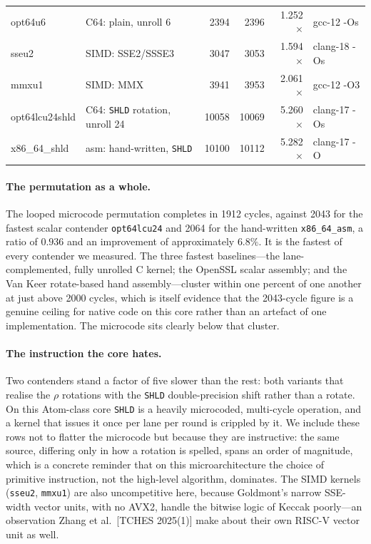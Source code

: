 \begin{table}[t]
\begin{tabular}{@{}llrrrl@{}}
opt64u6           & C64: plain, unroll 6                     & 2394 & 2396 & 1.252$\times$ & gcc-12 -Os \\
sseu2             & SIMD: SSE2/SSSE3                         & 3047 & 3053 & 1.594$\times$ & clang-18 -Os \\
mmxu1             & SIMD: MMX                                & 3941 & 3953 & 2.061$\times$ & gcc-12 -O3 \\
opt64lcu24shld    & C64: \texttt{SHLD} rotation, unroll 24   & 10058 & 10069 & 5.260$\times$ & clang-17 -Os \\
x86\_64\_shld     & asm: hand-written, \texttt{SHLD}         & 10100 & 10112 & 5.282$\times$ & clang-17 -O \\
\bottomrule
\end{tabular}
\end{table}

\paragraph{The permutation as a whole.}
The looped microcode permutation completes in 1912 cycles, against 2043 for the
fastest scalar contender \texttt{opt64lcu24} and 2064 for the hand-written
\texttt{x86\_64\_asm}, a ratio of $0.936$ and an improvement of approximately
$6.8\%$. It is the fastest of every contender we measured. The three fastest
baselines---the lane-complemented, fully unrolled C kernel; the OpenSSL scalar
assembly; and the Van Keer rotate-based hand assembly---cluster within one percent
of one another at just above 2000 cycles, which is itself evidence that the
2043-cycle figure is a genuine ceiling for native code on this core rather than an
artefact of one implementation. The microcode sits clearly below that cluster.

\paragraph{The instruction the core hates.}
Two contenders stand a factor of five slower than the rest: both variants that
realise the $\rho$ rotations with the \texttt{SHLD} double-precision shift rather
than a rotate. On this Atom-class core \texttt{SHLD} is a heavily microcoded,
multi-cycle operation, and a kernel that issues it once per lane per round is
crippled by it. We include these rows not to flatter the microcode but because
they are instructive: the same source, differing only in how a rotation is
spelled, spans an order of magnitude, which is a concrete reminder that on this
microarchitecture the choice of primitive instruction, not the high-level
algorithm, dominates. The SIMD kernels (\texttt{sseu2}, \texttt{mmxu1}) are also
uncompetitive here, because Goldmont's narrow SSE-width vector units, with no AVX2,
handle the bitwise logic of Keccak poorly---an observation Zhang et al.\
[TCHES 2025(1)] make about their own RISC-V vector unit as well.

